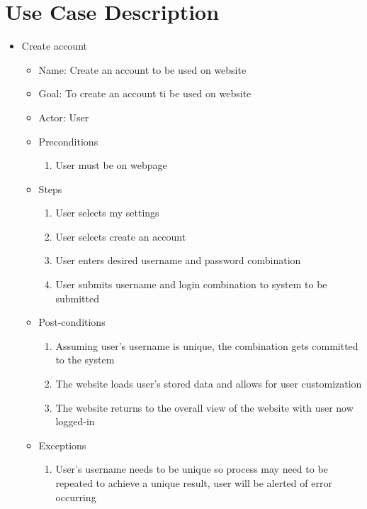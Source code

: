 \section{Use Case Description}
\begin{itemize}
\item Create account
	\begin{itemize}
	\item Name: Create an account to be used on website
    \item Goal: To create an account ti be used on website
    \item Actor: User
    \item Preconditions
		\begin{enumerate}
		\item User must be on webpage
        \end{enumerate}
    \item Steps
    	\begin{enumerate}
		\item User selects my settings
        \item User selects create an account 
        \item User enters desired username and password combination
        \item User submits username and login combination to system to be submitted
        \end{enumerate}
    \item Post-conditions
		\begin{enumerate}
		\item Assuming user's username is unique, the combination gets committed to the system
        \item The website loads user's stored data and allows for user customization 
        \item The website returns to the overall view of the website with user now logged-in
        \end{enumerate}
    \item Exceptions
    	\begin{enumerate} 
    	\item User's username needs to be unique so process may need to be repeated to achieve a unique result, user will be alerted of error occurring 
        \end{enumerate}
    \end{itemize}


\end{itemize}
